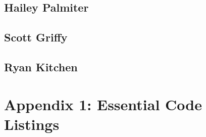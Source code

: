 \documentclass[letterpaper, onecolumn,10pt,draftclsnofoot]{IEEEtran}
\begin{document}
	\subsection{Hailey Palmiter}
		
	\subsection{Scott Griffy}
		
	\subsection{Ryan Kitchen}
		
		
\section{Appendix 1: Essential Code Listings}






   
\end{document}

